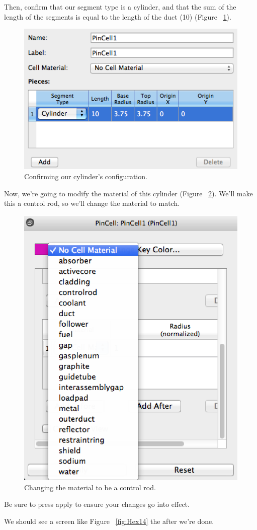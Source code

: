 Then, confirm that our segment type is a cylinder, and that the sum of the length of the segments is equal to the length of the duct (10) (Figure ~\ref{fig:Hex12}).

\begin{figure}[H]
	\begin{center}
		\includegraphics[width=0.5\linewidth]{Images/hex-pin-configure.png}
		\caption{Confirming our cylinder's configuration.}
		\label{fig:Hex12}
	\end{center}
\end{figure}

Now, we're going to modify the material of this cylinder (Figure ~\ref{fig:Hex13}).  We'll make this a control rod, so we'll change the material to match.

\begin{figure}[H]
	\begin{center}
		\includegraphics[width=0.5\linewidth]{Images/hex-change-material.png}
		\caption{Changing the material to be a control rod.}
		\label{fig:Hex13}
	\end{center}
\end{figure}

Be sure to press apply to ensure your changes go into effect.

We should see a screen like Figure ~\ref{fig:Hex14} the after we're done.

